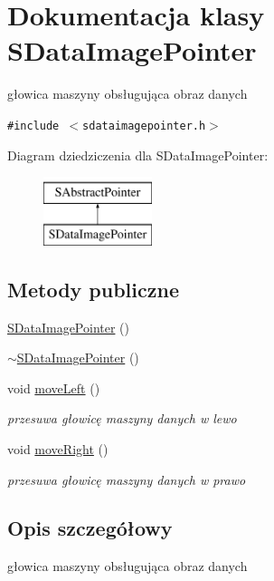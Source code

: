 \hypertarget{classSDataImagePointer}{
\section{Dokumentacja klasy SDataImagePointer}
\label{classSDataImagePointer}
}
głowica maszyny obsługująca obraz danych  


{\tt \#include $<$sdataimagepointer.h$>$}

Diagram dziedziczenia dla SDataImagePointer:\begin{figure}[H]
\begin{center}
\leavevmode
\includegraphics[height=2cm]{classSDataImagePointer}
\end{center}
\end{figure}
\subsection*{Metody publiczne}
\begin{CompactItemize}
\item 
\hyperlink{classSDataImagePointer_2ffb42e886f442004cd21617a6ea034d}{SDataImagePointer} ()
\item 
\hyperlink{classSDataImagePointer_8f96c4dc8dc25e0ff5cccb2e693ffcc8}{$\sim$SDataImagePointer} ()
\item 
void \hyperlink{classSDataImagePointer_811380aecd0dc422333dcdcd41f91ba7}{moveLeft} ()
\begin{CompactList}\small\item\em przesuwa głowicę maszyny danych w lewo \item\end{CompactList}\item 
void \hyperlink{classSDataImagePointer_b9d61712c0b2bf8b7beab735c0e59f75}{moveRight} ()
\begin{CompactList}\small\item\em przesuwa głowicę maszyny danych w prawo \item\end{CompactList}\end{CompactItemize}


\subsection{Opis szczegółowy}
głowica maszyny obsługująca obraz danych 

